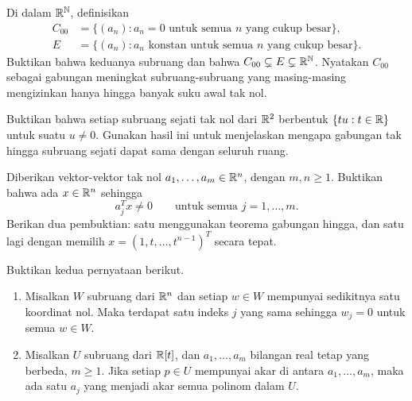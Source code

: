 \begin{latihan}\label{linear:lat-barisan}
    Di dalam $\mathbb{R}^{\mathbb N}$, definisikan
    \begin{align*}
        C_{00} & =\{(a_n):a_n=0\text{ untuk semua }n\text{ yang cukup besar}\},       \\
        E      & =\{(a_n):a_n\text{ konstan untuk semua }n\text{ yang cukup besar}\}.
    \end{align*}
    Buktikan bahwa keduanya subruang dan bahwa
    $C_{00}\subsetneq E\subsetneq\mathbb{R}^{\mathbb N}$.
    Nyatakan $C_{00}$ sebagai gabungan meningkat subruang-subruang
    yang masing-masing mengizinkan hanya hingga banyak suku awal tak nol.
\end{latihan}

\begin{latihan}\label{linear:lat-garis}
    Buktikan bahwa setiap subruang sejati tak nol dari $\mathbb{R}^2$
    berbentuk $\{tu:t\in\mathbb{R}\}$ untuk suatu $u\ne0$.
    Gunakan hasil ini untuk menjelaskan mengapa gabungan tak hingga
    subruang sejati dapat sama dengan seluruh ruang.
\end{latihan}

\begin{latihan}\label{linear:lat-hindari}
    Diberikan vektor-vektor tak nol $a_1,\ldots,a_m\in\mathbb{R}^n$,
    dengan $m,n\ge1$. Buktikan bahwa ada $x\in\mathbb{R}^n$ sehingga
    \[
        a_j^Tx\ne0\qquad\text{untuk semua }j=1,\ldots,m.
    \]
    Berikan dua pembuktian: satu menggunakan teorema gabungan hingga,
    dan satu lagi dengan memilih $x=(1,t,\ldots,t^{n-1})^T$ secara tepat.
\end{latihan}

\begin{latihan}\label{linear:lat-nol-bersama}
    Buktikan kedua pernyataan berikut.
    \begin{enumerate}[label=(\alph*)]
        \item Misalkan $W$ subruang dari $\mathbb{R}^n$ dan setiap $w\in W$
              mempunyai sedikitnya satu koordinat nol. Maka terdapat
              satu indeks $j$ yang sama sehingga $w_j=0$ untuk semua $w\in W$.
        \item Misalkan $U$ subruang dari $\mathbb{R}[t]$, dan
              $a_1,\ldots,a_m$ bilangan real tetap yang berbeda, $m\ge1$.
              Jika setiap $p\in U$ mempunyai akar di antara
              $a_1,\ldots,a_m$, maka ada satu $a_j$ yang menjadi
              akar semua polinom dalam $U$.
    \end{enumerate}
\end{latihan}

